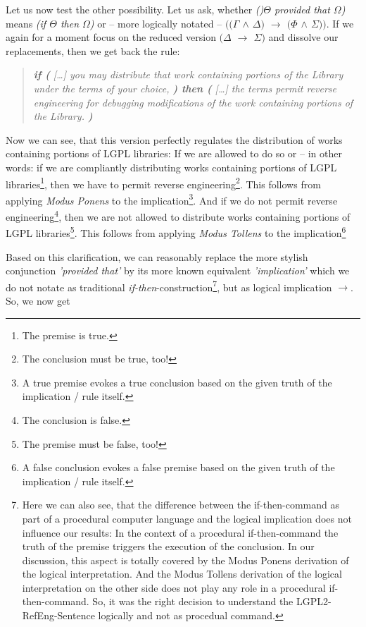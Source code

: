 Let us now test the other possibility. Let us ask, whether \emph{()$\Theta$
provided that $\Omega$)} means \emph{(if $\Theta$ then $\Omega$)} or -- more
logically notated -- \emph{$((\Gamma$ $\wedge$ $\Delta)$ $\rightarrow$ $(\Phi$
$\wedge$ $\Sigma))$}. If we again for a moment focus on the reduced version
\emph{$(\Delta$ $\rightarrow$ $\Sigma)$} and dissolve our replacements, then we
get back the rule:

\begin{quote}\noindent\emph{\textbf{if (} [\ldots] you may distribute that work
containing portions of the Library under the terms of your choice, \textbf{)
then (} [\ldots] the terms permit reverse engineering for debugging
modifications of the work containing portions of the Library.
\textbf{)}}\end{quote}

Now we can see, that this version perfectly regulates the distribution of works
containing portions of LGPL libraries: If we are allowed to do so or -- in other
words: if we are compliantly distributing works containing portions of LGPL
libraries\footnote{The premise is true.}, then we have to permit reverse
engineering\footnote{The conclusion must be true, too!}. This follows from
applying \emph{Modus Ponens} to the implication\footnote{A true premise evokes a
true conclusion based on the given truth of the implication / rule itself.}. And
if we do not permit reverse engineering\footnote{The conclusion is false.}, then
we are not allowed to distribute works containing portions of LGPL
libraries\footnote{The premise must be false, too!}. This follows from applying
\emph{Modus Tollens} to the implication\footnote{A false conclusion evokes a
false premise based on the given truth of the implication / rule itself.}

Based on this clarification, we can reasonably replace the more stylish
conjunction \emph{'provided that'} by its more known equivalent
\emph{'implication'} which we do not notate as traditional
\emph{if-then}-construction\footnote{Here we can also see, that the difference
between the if-then-command as part of a procedural computer language and the
logical implication does not influence our results: In the context of a
procedural if-then-command the truth of the premise triggers the execution of
the conclusion. In our discussion, this aspect is totally covered by the Modus
Ponens derivation of the logical interpretation. And the Modus Tollens
derivation of the logical interpretation on the other side does not play any
role in a procedural if-then-command. So, it was the right decision to
understand the LGPL2-RefEng-Sentence logically and not as procedual command.}, but
as logical implication \emph{$\rightarrow$}. So, we now get


